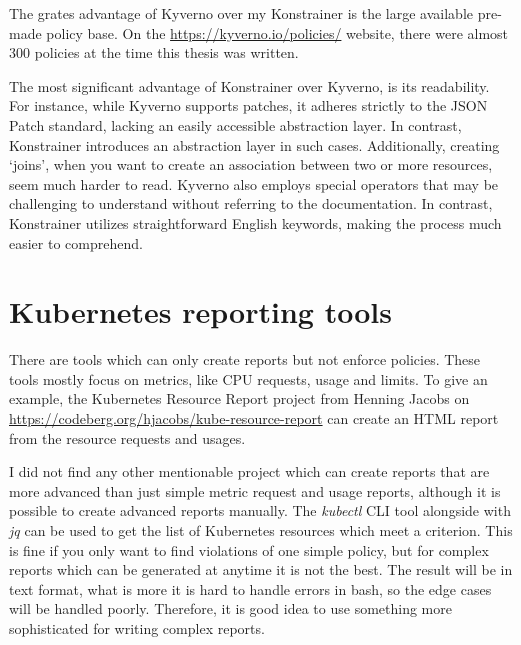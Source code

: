 The grates advantage of Kyverno over my Konstrainer is the large available pre-made policy base. On the \url{https://kyverno.io/policies/} website, there were almost 300 policies at the time this thesis was written.

The most significant advantage of Konstrainer over Kyverno, is its readability. For instance, while Kyverno supports patches, it adheres strictly to the JSON Patch standard, lacking an easily accessible abstraction layer. In contrast, Konstrainer introduces an abstraction layer in such cases. Additionally, creating `joins', when you want to create an association between two or more resources, seem much harder to read. Kyverno also employs special operators that may be challenging to understand without referring to the documentation. In contrast, Konstrainer utilizes straightforward English keywords, making the process much easier to comprehend.

\section{Kubernetes reporting tools}

There are tools which can only create reports but not enforce policies. These tools mostly focus on metrics, like CPU requests, usage and limits. To give an example, the Kubernetes Resource Report project from Henning Jacobs on \url{https://codeberg.org/hjacobs/kube-resource-report} can create an HTML report from the resource requests and usages.

I did not find any other mentionable project which can create reports that are more advanced than just simple metric request and usage reports, although it is possible to create advanced reports manually. The \emph{kubectl} CLI tool alongside with \emph{jq} can be used to get the list of Kubernetes resources which meet a criterion. This is fine if you only want to find violations of one simple policy, but for complex reports which can be generated at anytime it is not the best. The result will be in text format, what is more it is hard to handle errors in bash, so the edge cases will be handled poorly. Therefore, it is good idea to use something more sophisticated for writing complex reports.
